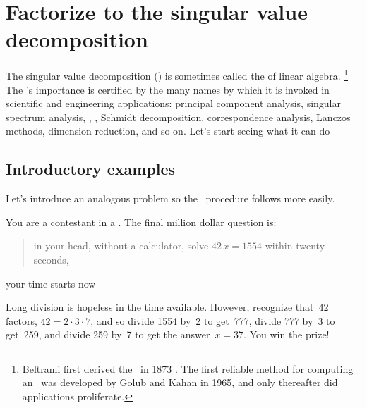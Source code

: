 

\section{Factorize to the singular value decomposition}
\label{sec:fisvd}
\secttoc


\begin{comment}
\pooliv{\S7.4} \holti{\S8.4} \cite[\S06]{Davis99a} \cite[\S8.7]{Nakos1998}
In a sense, the \svd\ replaces the \(\tr PLU\) factorization of classic linear algebra, e.g.\ \pooliv{\S3.4}.
The computation of an \svd\ is well conditioned, unlike \textsc{lu} decomposition and eigenvalue calculations which are commonly poorly conditioned.
\end{comment}


The singular value decomposition (\svd) is sometimes called the  of  linear algebra.%
\footnote{Beltrami first derived the \svd\ in 1873 \cite[]{Stewart1993}.  
The first reliable method for computing an \svd\ was developed by Golub and Kahan in 1965, and only thereafter did applications proliferate.}
The \svd's importance is certified by the many names by which it is invoked 
in scientific and engineering applications: principal component 
analysis, singular spectrum analysis, , , Schmidt decomposition, correspondence analysis, Lanczos methods, dimension reduction, and so on.
Let's start seeing what it can do 




\subsection{Introductory examples}
\label{sec:svdeg}

Let's introduce an analogous problem so the \svd\ procedure follows more easily.

You are a contestant in a .
The final million dollar question is: 
\begin{quote}
in your head, without a calculator, solve \(42\,x=1554\) within twenty seconds,
\end{quote} 
your time starts now \dotfill
\begin{solution} 
Long division is hopeless in the time available.  
However, recognize that~\(42\) factors, \(42=2\cdot3\cdot7\), and so divide 1554 by~2 to get~777, divide 777 by~3 to get~259, and divide 259 by~7 to get the answer~\(x=37\). 
You win the prize!
\end{solution}

